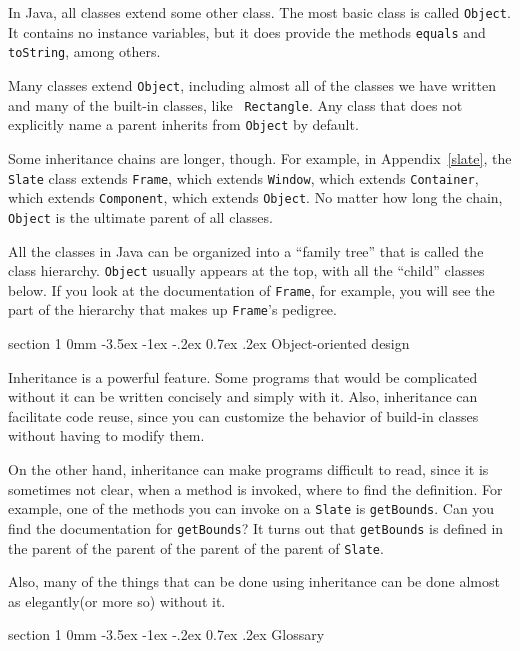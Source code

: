 \documentclass{book}
\makeatletter
\renewcommand{\section}{\@startsection 
    {section} {1} {0mm}%
    {-3.5ex \@plus -1ex \@minus -.2ex}%
    {0.7ex \@plus.2ex}%
    {\normalfont\Large\bfseries}}
\makeatother
\begin{document}
In Java, all classes extend some other class.  The most basic class is
called {\tt Object}.  It contains no instance variables, but it does
provide the methods {\tt equals} and {\tt toString}, among others.

Many classes extend {\tt Object}, including almost all of the classes
we have written and many of the built-in classes, like {\tt
Rectangle}.  Any class that does not explicitly name a parent inherits
from {\tt Object} by default.

Some inheritance chains are longer, though.  For example, 
in Appendix~\ref{slate}, the
{\tt Slate} class
extends {\tt Frame}, which
extends {\tt Window}, which extends {\tt Container}, which extends
{\tt Component}, which extends {\tt Object}.  No matter how long the
chain, {\tt Object} is the ultimate parent of all classes.

All the classes in Java can be organized into a ``family tree'' that
is called the class hierarchy.  {\tt Object} usually appears at the
top, with all the ``child'' classes below.  If you look at the
documentation of {\tt Frame}, for example, you will see the part of
the hierarchy that makes up {\tt Frame}'s pedigree.


\section {Object-oriented design}

Inheritance is a powerful feature.  Some programs that would be
complicated without it can be written concisely and simply
with it.  Also, inheritance can facilitate code reuse, since you can
customize the behavior of build-in classes without having to modify
them.

On the other hand, inheritance can make programs difficult to read,
since it is sometimes not clear, when a method is invoked, where to
find the definition.  For example, one of the methods you can invoke
on a {\tt Slate} is {\tt getBounds}.  Can you find the documentation
for {\tt getBounds}?  It turns out that {\tt getBounds} is defined in
the parent of the parent of the parent of the parent of {\tt Slate}.

Also, many of the things that can be done using inheritance can
be done almost as elegantly(or more so) without it.


\section{Glossary}
\end{document}
